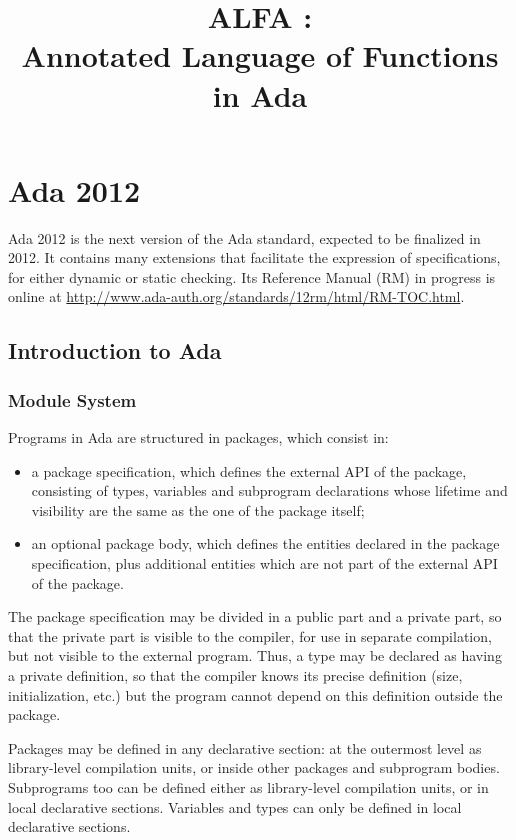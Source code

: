 \documentclass{article}
\title{ALFA \version:\\Annotated Language of Functions in Ada}
\begin{document}
\maketitle
\sloppy

\newpage

\setcounter{tocdepth}{2}
\tableofcontents

\newpage

\section{Ada 2012}

Ada 2012 is the next version of the Ada standard, expected to be finalized in
2012. It contains many extensions that facilitate the expression of
specifications, for either dynamic or static checking. Its Reference Manual
(RM) in progress is online at
\url{http://www.ada-auth.org/standards/12rm/html/RM-TOC.html}.

\subsection{Introduction to Ada}

\subsubsection{Module System}

Programs in Ada are structured in packages, which consist in:
\begin{itemize}
\item a package specification, which defines the external API of the package,
  consisting of types, variables and subprogram declarations whose lifetime and
  visibility are the same as the one of the package itself;
\item an optional package body, which defines the entities declared in the
  package specification, plus additional entities which are not part of the
  external API of the package.
\end{itemize}

The package specification may be divided in a public part and a private part,
so that the private part is visible to the compiler, for use in separate
compilation, but not visible to the external program. Thus, a type may be
declared as having a private definition, so that the compiler knows its precise
definition (size, initialization, etc.) but the program cannot depend on this
definition outside the package.

Packages may be defined in any declarative section: at the outermost level as
library-level compilation units, or inside other packages and subprogram
bodies. Subprograms too can be defined either as library-level compilation
units, or in local declarative sections. Variables and types can only be
defined in local declarative sections.
\end{document}
